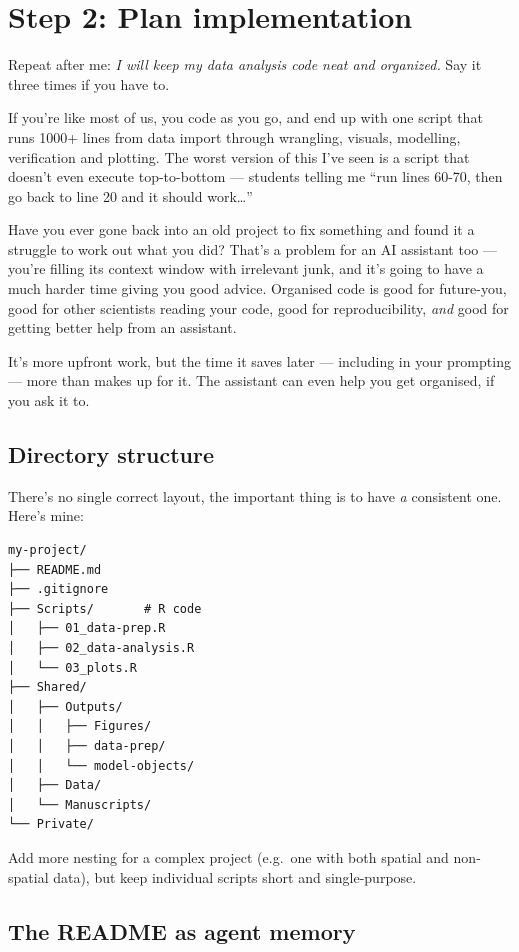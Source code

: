\documentclass[
  letterpaper,
  DIV=11,
  numbers=noendperiod]{scrreprt}
\begin{document}
\chapter{Step 2: Plan implementation}\label{step-2-plan-implementation}

Repeat after me: \emph{I will keep my data analysis code neat and
organized.} Say it three times if you have to.

If you're like most of us, you code as you go, and end up with one
script that runs 1000+ lines from data import through wrangling,
visuals, modelling, verification and plotting. The worst version of this
I've seen is a script that doesn't even execute top-to-bottom ---
students telling me ``run lines 60-70, then go back to line 20 and it
should work\ldots{}''

Have you ever gone back into an old project to fix something and found
it a struggle to work out what you did? That's a problem for an AI
assistant too --- you're filling its context window with irrelevant
junk, and it's going to have a much harder time giving you good advice.
Organised code is good for future-you, good for other scientists reading
your code, good for reproducibility, \emph{and} good for getting better
help from an assistant.

It's more upfront work, but the time it saves later --- including in
your prompting --- more than makes up for it. The assistant can even
help you get organised, if you ask it to.

\section{Directory structure}\label{directory-structure}

There's no single correct layout, the important thing is to have
\emph{a} consistent one. Here's mine:

\begin{verbatim}
my-project/
├── README.md
├── .gitignore
├── Scripts/       # R code
│   ├── 01_data-prep.R
│   ├── 02_data-analysis.R
│   └── 03_plots.R
├── Shared/
│   ├── Outputs/
│   │   ├── Figures/
│   │   ├── data-prep/
│   │   └── model-objects/
│   ├── Data/
│   └── Manuscripts/
└── Private/
\end{verbatim}

Add more nesting for a complex project (e.g.~one with both spatial and
non-spatial data), but keep individual scripts short and single-purpose.

\section{The README as agent memory}\label{the-readme-as-agent-memory}
\end{document}
